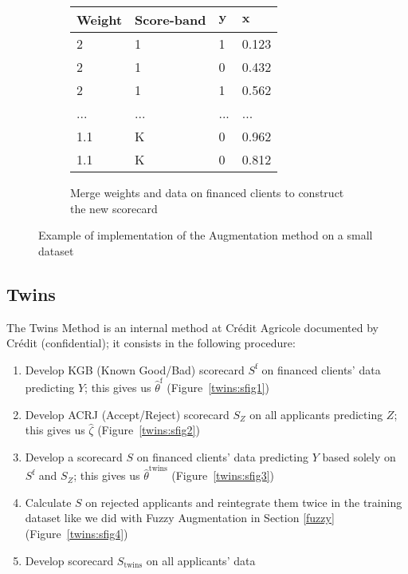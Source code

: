 \begin{figure}
{\begin{multicols}{3}
\begin{subfigure}[t]{0.31\textwidth}
\begin{center}
\begin{adjustbox}{max width=0.95\textwidth}
\begin{tabular}{l l l l}
\toprule
\textbf{Weight} & \textbf{Score-band} & \textbf{${\bm{y}}$} & \textbf{${\bm{x}}$}\\
\midrule
2 & 1 & 1 & 0.123 \\
2 & 1 & 0 & 0.432 \\
2 & 1 & 1 & 0.562 \\
... & ... & ... & ... \\
1.1 & K & 0 & 0.962 \\
1.1 & K & 0 & 0.812 \\
\bottomrule
\end{tabular}
\end{adjustbox}
\end{center}

\caption{Merge weights and data on financed clients to construct the new scorecard}
\label{augment:sfig3}
\end{subfigure}
\end{multicols}
}
\caption{Example of implementation of the Augmentation method on a small dataset}
\label{augmentexample}
\end{figure}

\subsection{Twins} \label{Twins}

The Twins Method is an internal method at Crédit Agricole documented by Crédit \cite{groupe} (confidential); it consists in the following procedure:
\begin{enumerate}
\item Develop KGB (Known Good/Bad) scorecard $S^{\text{f}}$ on financed clients' data predicting $Y$; this gives us $\hat{\theta}^{\text{f}}$ (Figure~\ref{twins:sfig1})
\item Develop ACRJ (Accept/Reject) scorecard $S_Z$ on all applicants predicting $Z$; this gives us $\hat{\zeta}$ (Figure~\ref{twins:sfig2})
\item Develop a scorecard $S$ on financed clients' data predicting $Y$ based solely on $S^{\text{f}}$ and $S_Z$; this gives us $\hat{\theta}^{\text{twins}}$ (Figure~\ref{twins:sfig3})
\item Calculate $S$ on rejected applicants and reintegrate them twice in the training dataset like we did with Fuzzy Augmentation in Section \ref{fuzzy} (Figure~\ref{twins:sfig4})
\item Develop scorecard $S_{\text{twins}}$ on all applicants' data
\end{enumerate}

